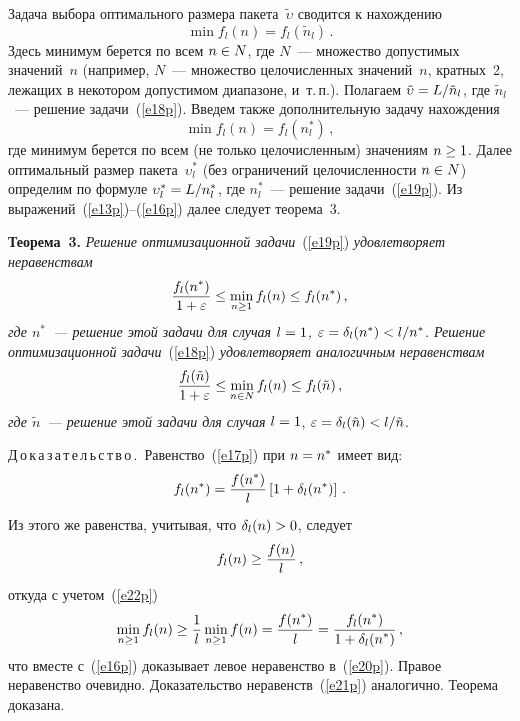 \begin{multicols}{2}
     Задача выбора оптимального размера пакета~$\tilde{\upsilon}$ сводится к 
нахождению 
     \begin{equation}
     \min f_l(n) =f_l\left(\tilde{n}_l\right)\,.
     \label{e18p}
     \end{equation}
Здесь минимум берется по всем $n\hm\in N$, где $N$~--- множество 
допустимых значений~$n$ (например, $N$~--- множество це\-ло\-чис\-лен\-ных 
значений~$n$, кратных~2, лежащих в некотором допустимом диапазоне, 
и~т.\,п.). Полагаем $\tilde{\upsilon}\hm=L/\tilde{n}_l$, где 
$\tilde{n}_l$~--- решение задачи~(\ref{e18p}). Введем также дополнительную 
задачу нахождения 
\begin{equation}
\min f_l(n) =f_l(n_l^*)\,,
\label{e19p}
\end{equation}
где минимум берется по всем (не только це\-ло\-чис\-лен\-ным) значениям 
$n\hm\geq 1$. Далее оптимальный размер пакета~$\upsilon_l^*$ (без 
ограничений це\-ло\-чис\-лен\-ности $n\hm\in N$) определим по формуле 
$\upsilon_l^*\hm=L/n_l^*$, где $n_l^*$~--- решение задачи~(\ref{e19p}). Из 
выражений~(\ref{e13p})--(\ref{e16p}) далее следует теорема~3.

\medskip

\noindent
\textbf{Теорема~3.} \textit{Решение оптимизационной задачи}~(\ref{e19p}) 
\textit{удовлетворяет неравенствам}
\begin{equation}
\displaystyle\frac{\displaystyle f_l(n^*)\mathstrut}{\displaystyle 1+\varepsilon\mathstrut}\leq \min\limits_{n\geq 1} f_l(n)\leq f_l(n^*)\,,
\label{e20p} 
\end{equation}
\textit{где $n^*$~--- решение этой задачи для случая $l\hm=1$, 
$\varepsilon\hm=\delta_l(n^*)\hm<l/n^*$. Решение оптимизационной 
задачи}~(\ref{e18p}) \textit{удовлетворяет аналогичным неравенствам}
\begin{equation}
\displaystyle\frac{\displaystyle f_l(\tilde{n})\mathstrut}{\displaystyle 1+\varepsilon\mathstrut}\leq \min\limits_{n\in N} f_l(n)\leq 
f_l(\tilde{n})\,, 
\label{e21p}
\end{equation}
\textit{где $\tilde{n}$~--- решение этой задачи для случая} $l\hm=1$, 
$\varepsilon\hm=\delta_l(\tilde{n})\hm<l/\tilde{n}$.
     
     \medskip
     
\noindent
     Д\,о\,к\,а\,з\,а\,т\,е\,л\,ь\,с\,т\,в\,о\,.\ Равенство~(\ref{e17p}) при 
$n\hm=n^*$ имеет вид:
     \begin{equation}
     f_l(n^*) =\displaystyle\frac{\displaystyle f(n^*)\mathstrut}{\displaystyle l\mathstrut}\left[ 1+\delta_l(n^*)\right]\,.
     \label{e22p}
     \end{equation}
Из этого же равенства, учитывая, что $\delta_l(n)\hm>0$, следует
$$
f_l(n)\geq \displaystyle\frac{\displaystyle f(n)\mathstrut}{\displaystyle l\mathstrut}\,,
$$
откуда с учетом~(\ref{e22p})
$$
\min\limits_{n\geq 1} f_l(n) \geq \displaystyle\frac{\displaystyle 1\mathstrut}{\displaystyle l\mathstrut}\min\limits_{n\geq 1} f(n) 
=\displaystyle\frac{\displaystyle f(n^*)\mathstrut}{\displaystyle l\mathstrut}= \displaystyle\frac{\displaystyle f_l(n^*)\mathstrut}{\displaystyle 1+\delta_l(n^*)\mathstrut}\,,
$$
что вместе с~(\ref{e16p}) доказывает левое неравенство в~(\ref{e20p}). 
Правое неравенство очевидно. Доказательство неравенств~(\ref{e21p}) 
аналогично. Теорема доказана.


\end{multicols}

